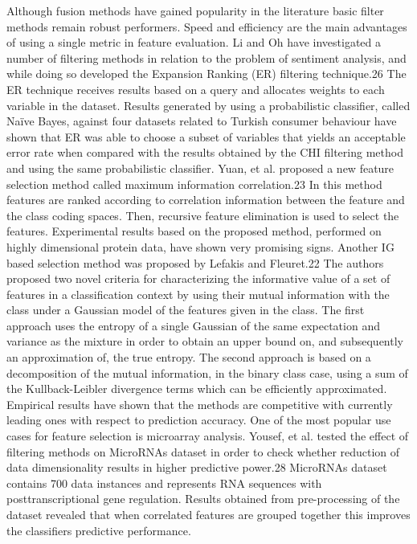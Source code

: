 \documentclass[review]{elsarticle}
\begin{document}
Although fusion methods have gained popularity in the literature basic filter methods remain robust performers. Speed and efficiency are the main advantages of using a single metric in feature evaluation. Li and Oh have investigated a number of filtering methods in relation to the problem of sentiment analysis, and while doing so developed the Expansion Ranking (ER) filtering technique.26  The ER technique receives results based on a query and allocates weights to each variable in the dataset. Results generated by using a probabilistic classifier, called Naïve Bayes, against four datasets related to Turkish consumer behaviour have shown that ER was able to choose a subset of variables that yields an acceptable error rate when compared with the results obtained by the CHI filtering method and using the same probabilistic classifier. Yuan, et al.  proposed a new feature selection method called maximum information correlation.23 In this method features are ranked according to correlation information between the feature and the class coding spaces. Then, recursive feature elimination is used to select the features. Experimental results based on the proposed method, performed on highly dimensional protein data, have shown very promising signs. Another IG based selection method was proposed by Lefakis and Fleuret.22  The authors proposed two novel criteria for characterizing the informative value of a set of features in a classification context by using their mutual information with the class under a Gaussian model of the features given in the class. The first approach uses the entropy of a single Gaussian of the same expectation and variance as the mixture in order to obtain an upper bound on, and subsequently an approximation of, the true entropy. The second approach is based on a decomposition of the mutual information, in the binary class case, using a sum of the Kullback-Leibler divergence terms which can be efficiently approximated. Empirical results have shown that the methods are competitive with currently leading ones with respect to prediction accuracy. One of the most popular use cases for feature selection is microarray analysis. Yousef, et al. tested the effect of filtering methods on MicroRNAs dataset in order to check whether reduction of data dimensionality results in higher predictive power.28 MicroRNAs dataset contains 700 data instances and represents RNA sequences with posttranscriptional gene regulation. Results obtained from pre-processing of the dataset revealed that when correlated features are grouped together this improves the classifiers predictive performance.
\end{document}
